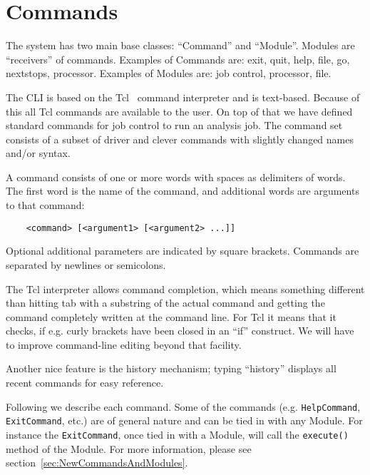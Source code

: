 \documentclass[12pt]{article}
\begin{document}
                                                          
\section{Commands }
\label{sec:Commands}

The system has two main base classes: ``Command'' and ``Module''.
Modules are ``receivers'' of commands. Examples of Commands are: exit,
quit, help, file, go, nextstops, processor.  Examples of Modules
are: job control, processor, file.

The CLI  is based on the
Tcl~\cite{TclInfo} command interpreter and is text-based. Because of
this all Tcl commands are available to the user.  On top of that we have
defined standard commands for job control to run an analysis job. The
command set consists of a subset of driver and clever commands with
slightly changed names and/or syntax.

A command consists of one or more words with spaces as delimiters of
words.  The first word is the name of the command, and additional words
are arguments to that command:
%
\begin{verbatim}
	<command> [<argument1> [<argument2> ...]]
\end{verbatim}
%
Optional additional parameters are indicated by square brackets.
Commands are separated by newlines or semicolons.

The Tcl interpreter allows command completion, which means something
different than hitting tab with a substring of the actual command and
getting the command completely written at the command line. For Tcl it
means that it checks, if e.g. curly brackets have been closed in an
``if'' construct. We will have to improve command-line editing beyond
that facility.

Another nice feature is the history mechanism; typing ``history''
displays all recent commands for easy reference.

Following we describe each command. Some of the commands
(e.g. \texttt{HelpCommand}, \texttt{ExitCommand}, etc.) are of general
nature and can be tied in with any Module. For instance the
\texttt{ExitCommand}, once tied in with a Module, will call the
\texttt{execute()} method of the Module. For more information, please
see section~\ref{sec:NewCommandsAndModules}. 


\end{document}
